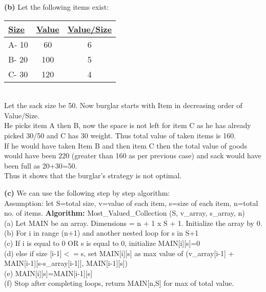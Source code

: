 \documentclass[11pt]{article}
\renewcommand\part[1]{\vspace{.10in}\textbf{(#1)}}
\newcommand\algorithm{\vspace{.10in}\textbf{Algorithm: }}
\begin{document}
\part{b}
Let the following items exist:\\
\bgroup 
\def\arraystretch{1.8}
\begin{tabular}{|l|c|c|} \hline 
{\bf \underline {Size}} & {\bf \underline {Value}} & {\bf \underline {Value/Size}}\\ \hline

A- 10 & 60 & 6 \\ \hline
B- 20 & 100 & 5 \\ \hline
C- 30 & 120 & 4 \\ \hline

\end{tabular}
\egroup
\\Let the sack size be 50. Now burglar starts with Item in decreasing order of Value/Size.
\\He picks item A then B, now the space is not left for item C as he has already picked 30/50 and C has 30 weight. Thus total value of taken items is 160.
\\If he would have taken Item B and then item C then the total value of goods would have been 220 (greater than 160 as per previous case) and sack would have been full as 20+30=50.
\\Thus it shows that the burglar's strategy is not optimal.

\part{c}
We can use the following step by step algorithm:\\
Assumption: let S=total size, v=value of each item, s=size of each item, n=total no. of items.
\algorithm
Most\_Valued\_Collection (S, v\_array, s\_array, n)\\
(a) Let MAIN be an array. Dimensions = n + 1 x S + 1. Initialize the array by 0.\\
(b) For i in range (n+1) and another nested loop for s in S+1\\
(c) If i is equal to 0 OR s is equal to 0, initialize MAIN[i][s]=0\\
(d) else if size [i-1]$<=$s, set MAIN[i][s] as max value of (v\_array[i-1] + MAIN[i-1][s-s\_array[i-1]], MAIN[i-1][s])\\
(e) MAIN[i][s]=MAIN[i-1][s]\\
(f) Stop after completing loops, return MAIN[n,S] for max of total value.
\end{document}
